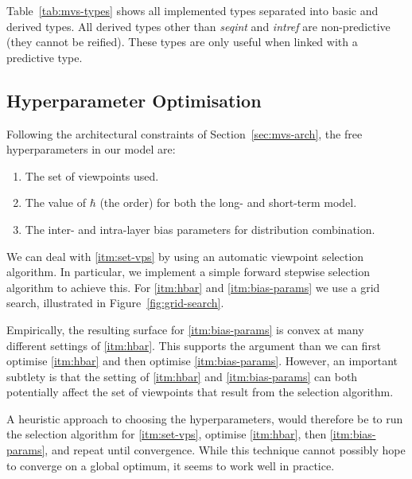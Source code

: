 \documentclass[12pt,a4paper,twoside,openright]{report}
\begin{document}
Table~\ref{tab:mvs-types} shows all implemented types separated into basic and
derived types. All derived types other than \emph{seqint} and \emph{intref} are
non-predictive (they cannot be reified). These types are only useful when linked
with a predictive type.

\subsection{Hyperparameter Optimisation}\label{sec:mvs-hyperparams}

Following the architectural constraints of Section~\ref{sec:mvs-arch}, the
free hyperparameters in our model are:
\begin{enumerate}[label=(\arabic*), itemsep=0mm]
  \item The set of viewpoints used. \label{itm:set-vps}
  \item The value of $\hbar$ (the order) for both the long- and short-term
    model. \label{itm:hbar}
  \item The inter- and intra-layer bias parameters for distribution combination.
    \label{itm:bias-params}
\end{enumerate}

We can deal with \ref{itm:set-vps} by using an automatic viewpoint selection
algorithm. In particular, we implement a simple forward stepwise selection
algorithm to achieve this. For \ref{itm:hbar} and \ref{itm:bias-params} we use a
grid search, illustrated in Figure~\ref{fig:grid-search}. 

Empirically, the resulting surface for \ref{itm:bias-params} is convex at many
different settings of \ref{itm:hbar}. This supports the argument than we can
first optimise \ref{itm:hbar} and then optimise \ref{itm:bias-params}. However,
an important subtlety is that the setting of \ref{itm:hbar} and
\ref{itm:bias-params} can both potentially affect the set of viewpoints that
result from the selection algorithm.

A heuristic approach to choosing the hyperparameters, would therefore be to run
the selection algorithm for \ref{itm:set-vps}, optimise \ref{itm:hbar}, then
\ref{itm:bias-params}, and repeat until convergence. While this technique cannot
possibly hope to converge on a global optimum, it seems to work well in
practice.
\end{document}

